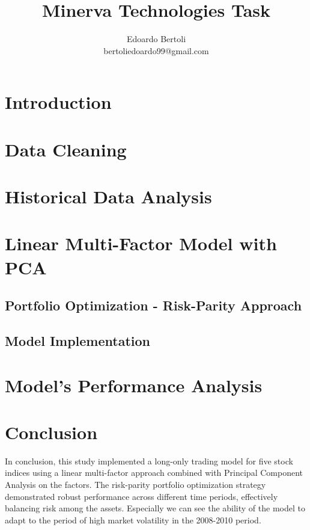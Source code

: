 \documentclass[a4paper,11pt]{article}
\title{Minerva Technologies Task}
\author{Edoardo Bertoli\\bertoliedoardo99@gmail.com}
\begin{document}
\maketitle


\tableofcontents
\thispagestyle{empty} 
\clearpage





\section{Introduction}
\label{intro}


\section{Data Cleaning}
\label{datacleaning}


\section{Historical Data Analysis}
\label{dataanalysis}


\section{Linear Multi-Factor Model with PCA}
\label{pca-apt}

\subsection{Portfolio Optimization - Risk-Parity Approach}
\label{optimization}

\subsection{Model Implementation}
\label{implementation}


\section{Model's Performance Analysis}
\label{model-testing}


\section{Conclusion}
In conclusion, this study implemented a long-only trading model for five stock indices using a linear multi-factor approach combined with Principal Component Analysis on the factors. The risk-parity portfolio optimization strategy demonstrated robust performance across different time periods, effectively balancing risk among the assets. Especially we can see the ability of the model to adapt to the period of high market volatility in the 2008-2010 period.
\end{document}
